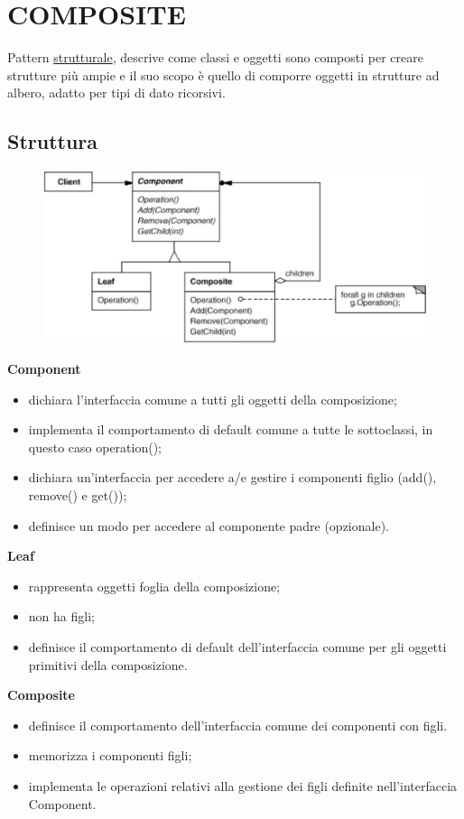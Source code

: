 \chapter{COMPOSITE}

Pattern \underline{strutturale}, descrive come classi e oggetti sono composti per creare strutture più ampie e il suo scopo è quello di comporre oggetti in strutture 
ad albero, adatto per tipi di dato ricorsivi.

\section{Struttura}

\begin{figure}[H]
    \centering
    \includegraphics[width=0.5\linewidth]{../../immagini/composite/struttura_composite}
\end{figure}

\textbf{Component}
\begin{itemize}
    \item dichiara l’interfaccia comune a tutti gli oggetti della composizione;
    \item implementa il comportamento di default comune a tutte le sottoclassi, in questo caso operation();
    \item dichiara un’interfaccia per accedere a/e gestire i componenti figlio (add(), remove() e get());
    \item definisce un modo per accedere al componente padre (opzionale).
\end{itemize}

\textbf{Leaf}
\begin{itemize}
    \item rappresenta oggetti foglia della composizione;
    \item non ha figli;
    \item definisce il comportamento di default dell’interfaccia comune per gli oggetti primitivi della composizione.
\end{itemize} 

\textbf{Composite}
\begin{itemize}
    \item definisce il comportamento dell’interfaccia comune dei componenti con figli.
    \item memorizza i componenti figli;
    \item implementa le operazioni relativi alla gestione dei figli definite nell’interfaccia Component.
\end{itemize}

